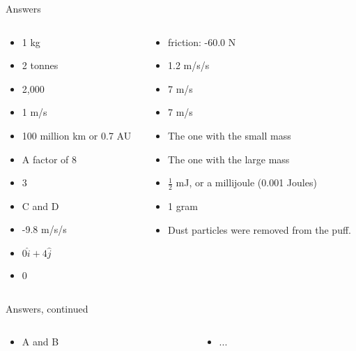 \documentclass{beamer}
\begin{document}
\begin{frame}{Answers}
\begin{columns}[T]
\begin{column}{0.5\textwidth}
\begin{itemize}
\item 1 kg
\item 2 tonnes
\item 2,000
\item 1 m/s
\item 100 million km or 0.7 AU
\item A factor of 8
\item 3
\item C and D
\item -9.8 m/s/s
\item $0\hat{i}+4\hat{j}$
\item 0
\end{itemize}
\end{column}
\begin{column}{0.5\textwidth}
\begin{itemize}
\item friction: -60.0 N
\item 1.2 m/s/s
\item 7 m/s
\item 7 m/s
\item The one with the small mass
\item The one with the large mass
\item $\frac{1}{2}$ mJ, or a millijoule (0.001 Joules)
\item 1 gram
\item Dust particles were removed from the puff.
\end{itemize}
\end{column}
\end{columns}
\end{frame}

\begin{frame}{Answers, continued}
\begin{columns}[T]
\begin{column}{0.5\textwidth}
\begin{itemize}
\item A and B
\end{itemize}
\end{column}
\begin{column}{0.5\textwidth}
\begin{itemize}
\item ...
\end{itemize}
\end{column}
\end{columns}
\end{frame}
\end{document}
